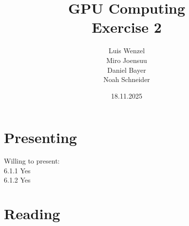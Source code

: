 \documentclass[12pt,twoside,a4paper]{article}
\title{GPU Computing\\
Exercise 2}
\author{
  Luis Wenzel\\
  Miro Joensuu\\
  Daniel Bayer\\
  Noah Schneider
}
\date{18.11.2025}
\begin{document}
\maketitle
\newpage
\tableofcontents
\section{Presenting}
Willing to present:\\
6.1.1 Yes\\
6.1.2 Yes\\
\section{Reading}


	

\FloatBarrier
\end{document}
